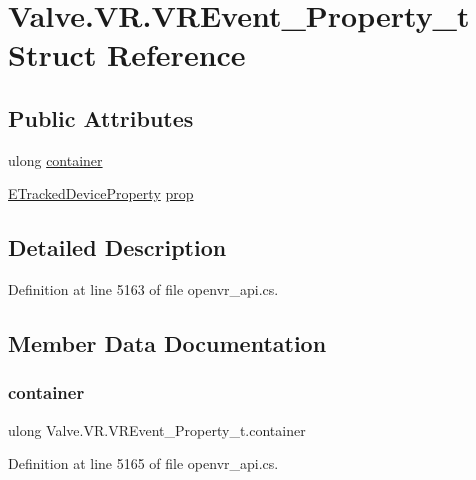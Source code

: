 \hypertarget{struct_valve_1_1_v_r_1_1_v_r_event___property__t}{}\section{Valve.\+V\+R.\+V\+R\+Event\+\_\+\+Property\+\_\+t Struct Reference}
\label{struct_valve_1_1_v_r_1_1_v_r_event___property__t}
\subsection*{Public Attributes}
\begin{DoxyCompactItemize}
\item 
ulong \mbox{\hyperlink{struct_valve_1_1_v_r_1_1_v_r_event___property__t_ad067c0d2979b7f5c0aa3a87611afa424}{container}}
\item 
\mbox{\hyperlink{namespace_valve_1_1_v_r_ab060521ead7273986988fc4897e52482}{E\+Tracked\+Device\+Property}} \mbox{\hyperlink{struct_valve_1_1_v_r_1_1_v_r_event___property__t_ad72d79db99053b3f4ae7146f40e32f2f}{prop}}
\end{DoxyCompactItemize}


\subsection{Detailed Description}


Definition at line 5163 of file openvr\+\_\+api.\+cs.



\subsection{Member Data Documentation}
\mbox{\label{struct_valve_1_1_v_r_1_1_v_r_event___property__t_ad067c0d2979b7f5c0aa3a87611afa424}} 
\subsubsection{\texorpdfstring{container}{container}}
{\footnotesize\ttfamily ulong Valve.\+V\+R.\+V\+R\+Event\+\_\+\+Property\+\_\+t.\+container}



Definition at line 5165 of file openvr\+\_\+api.\+cs.


